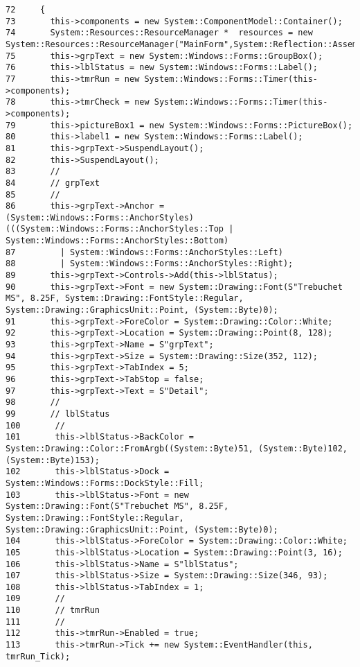 \footnotesize\begin{verbatim}72     {
73       this->components = new System::ComponentModel::Container();
74       System::Resources::ResourceManager *  resources = new System::Resources::ResourceManager("MainForm",System::Reflection::Assembly::GetCallingAssembly());
75       this->grpText = new System::Windows::Forms::GroupBox();
76       this->lblStatus = new System::Windows::Forms::Label();
77       this->tmrRun = new System::Windows::Forms::Timer(this->components);
78       this->tmrCheck = new System::Windows::Forms::Timer(this->components);
79       this->pictureBox1 = new System::Windows::Forms::PictureBox();
80       this->label1 = new System::Windows::Forms::Label();
81       this->grpText->SuspendLayout();
82       this->SuspendLayout();
83       // 
84       // grpText
85       // 
86       this->grpText->Anchor = (System::Windows::Forms::AnchorStyles)(((System::Windows::Forms::AnchorStyles::Top | System::Windows::Forms::AnchorStyles::Bottom) 
87         | System::Windows::Forms::AnchorStyles::Left) 
88         | System::Windows::Forms::AnchorStyles::Right);
89       this->grpText->Controls->Add(this->lblStatus);
90       this->grpText->Font = new System::Drawing::Font(S"Trebuchet MS", 8.25F, System::Drawing::FontStyle::Regular, System::Drawing::GraphicsUnit::Point, (System::Byte)0);
91       this->grpText->ForeColor = System::Drawing::Color::White;
92       this->grpText->Location = System::Drawing::Point(8, 128);
93       this->grpText->Name = S"grpText";
94       this->grpText->Size = System::Drawing::Size(352, 112);
95       this->grpText->TabIndex = 5;
96       this->grpText->TabStop = false;
97       this->grpText->Text = S"Detail";
98       // 
99       // lblStatus
100       // 
101       this->lblStatus->BackColor = System::Drawing::Color::FromArgb((System::Byte)51, (System::Byte)102, (System::Byte)153);
102       this->lblStatus->Dock = System::Windows::Forms::DockStyle::Fill;
103       this->lblStatus->Font = new System::Drawing::Font(S"Trebuchet MS", 8.25F, System::Drawing::FontStyle::Regular, System::Drawing::GraphicsUnit::Point, (System::Byte)0);
104       this->lblStatus->ForeColor = System::Drawing::Color::White;
105       this->lblStatus->Location = System::Drawing::Point(3, 16);
106       this->lblStatus->Name = S"lblStatus";
107       this->lblStatus->Size = System::Drawing::Size(346, 93);
108       this->lblStatus->TabIndex = 1;
109       // 
110       // tmrRun
111       // 
112       this->tmrRun->Enabled = true;
113       this->tmrRun->Tick += new System::EventHandler(this, tmrRun_Tick);

\end{verbatim}
